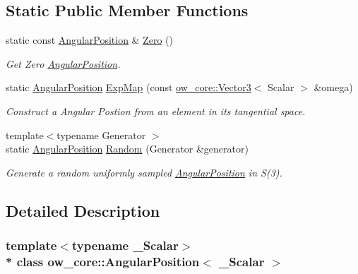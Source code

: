 \subsection*{Static Public Member Functions}
\begin{DoxyCompactItemize}
\item 
static const \hyperlink{classow__core_1_1AngularPosition}{Angular\+Position} \& \hyperlink{classow__core_1_1AngularPosition_a5e3640999ea9e1543357740870acfeb2}{Zero} ()
\begin{DoxyCompactList}\small\item\em Get Zero \hyperlink{classow__core_1_1AngularPosition}{Angular\+Position}. \end{DoxyCompactList}\item 
static \hyperlink{classow__core_1_1AngularPosition}{Angular\+Position} \hyperlink{classow__core_1_1AngularPosition_aba8e09b1b2c53e72063a9e630eeea554}{Exp\+Map} (const \hyperlink{classow__core_1_1Vector3}{ow\+\_\+core\+::\+Vector3}$<$ Scalar $>$ \&omega)\hypertarget{classow__core_1_1AngularPosition_aba8e09b1b2c53e72063a9e630eeea554}{}\label{classow__core_1_1AngularPosition_aba8e09b1b2c53e72063a9e630eeea554}

\begin{DoxyCompactList}\small\item\em Construct a Angular Postion from an element in its tangential space. \end{DoxyCompactList}\item 
{\footnotesize template$<$typename Generator $>$ }\\static \hyperlink{classow__core_1_1AngularPosition}{Angular\+Position} \hyperlink{classow__core_1_1AngularPosition_a0034cceb052df12c3f96b4281fdb3b3f}{Random} (Generator \&generator)
\begin{DoxyCompactList}\small\item\em Generate a random uniformly sampled \hyperlink{classow__core_1_1AngularPosition}{Angular\+Position} in S(3). \end{DoxyCompactList}\end{DoxyCompactItemize}


\subsection{Detailed Description}
\subsubsection*{template$<$typename \+\_\+\+Scalar$>$\\*
class ow\+\_\+core\+::\+Angular\+Position$<$ \+\_\+\+Scalar $>$}

